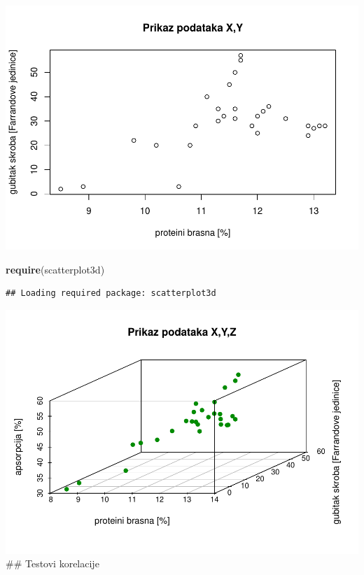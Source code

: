 \documentclass[]{article}
\newenvironment{Shaded}{\begin{snugshade}}{\end{snugshade}}
\newcommand{\KeywordTok}[1]{\textcolor[rgb]{0.13,0.29,0.53}{\textbf{{#1}}}}
\newcommand{\DataTypeTok}[1]{\textcolor[rgb]{0.13,0.29,0.53}{{#1}}}
\newcommand{\DecValTok}[1]{\textcolor[rgb]{0.00,0.00,0.81}{{#1}}}
\newcommand{\StringTok}[1]{\textcolor[rgb]{0.31,0.60,0.02}{{#1}}}
\newcommand{\NormalTok}[1]{{#1}}
\begin{document}
\includegraphics{Izvjestaj_files/figure-latex/unnamed-chunk-25-3.pdf}

\begin{Shaded}
\begin{Highlighting}[]
\KeywordTok{require}\NormalTok{(scatterplot3d)}
\end{Highlighting}
\end{Shaded}

\begin{verbatim}
## Loading required package: scatterplot3d
\end{verbatim}

\begin{Shaded}
\end{Shaded}

\includegraphics{Izvjestaj_files/figure-latex/unnamed-chunk-25-4.pdf}
\#\# Testovi korelacije
\end{document}
